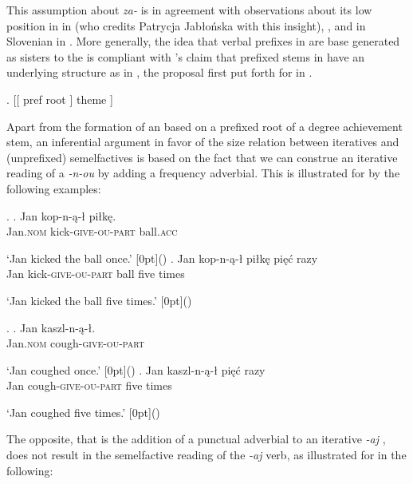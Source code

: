This assumption about \textit{za-} is in agreement with observations about its low position in  in \cite{Sven2004} (who credits Patrycja Jab\l{}o\'nska with this insight), \cite{Wiland2012}, and in Slovenian in \cite{Zaucer2005}. More generally, the idea that verbal prefixes in  are base generated as sisters to the  is compliant with \citeauthor{Caha-Zikova}'s \citeyearpar{Caha-Zikova} claim that prefixed  stems in  have an underlying structure as in \Next, the proposal first put forth for  in \cite{Sven2004b}.

\ex. [[ pref root ] theme ]  

Apart from the formation of an  based on a prefixed root of a  degree achievement stem, an inferential argument in favor of the size relation between iteratives and (unprefixed) semelfactives 	
is based on the fact that we can construe an iterative reading of a  \textit{-n-ou}  by adding a frequency adverbial. 
This is illustrated for  by the following examples:

\ex. 
\ag. 	Jan kop-n-\k{a}-\l {} pi\l k\k{e}. \\
	Jan.\textsc{nom} kick-\textsc{give-ou-part} ball.\textsc{acc}\\
	\strut `Jan kicked the ball once.' \hfill\raisebox{2.075\baselineskip}[0pt]{()}
\bg. 	Jan kop-n-\k{a}-\l {} pi\l k\k{e} {pi\k{e}\'c razy}  \\
	Jan kick-\textsc{give-ou-part} ball {five times}\\
	\strut `Jan kicked the ball five times.' \hfill\raisebox{2.075\baselineskip}[0pt]{()}

\ex. 
\ag. 	Jan kaszl-n-\k{a}-\l.  \\
	Jan.\textsc{nom} cough-\textsc{give-ou-part}\\
	\strut `Jan coughed once.' \hfill\raisebox{2.075\baselineskip}[0pt]{()}
\bg. 	Jan kaszl-n-\k{a}-\l {} {pi\k{e}\'c razy}\\
	Jan cough-\textsc{give-ou-part} {five times}\\
	\strut `Jan coughed five times.' \hfill\raisebox{2.075\baselineskip}[0pt]{()}

The opposite, that is the addition of a punctual adverbial to an iterative \textit{-aj} , does not result in the  semelfactive reading of the \textit{-aj} verb, as illustrated for  in the following:

